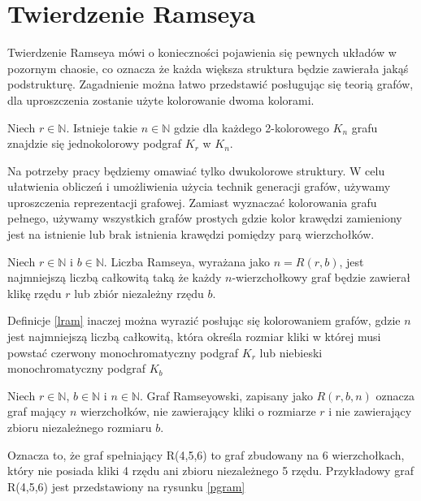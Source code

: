 \chapter{Twierdzenie Ramseya}
Twierdzenie Ramseya mówi o konieczności pojawienia się pewnych układów w pozornym chaosie\cite{dickson}, co oznacza że każda większa struktura będzie zawierała jakąś podstrukturę. Zagadnienie można łatwo przedstawić posługując się teorią grafów, dla uproszczenia zostanie użyte kolorowanie dwoma kolorami.

\begin{theorem}
Niech $r \in \mathbb{N}$. Istnieje takie $n \in \mathbb{N}$  gdzie dla każdego 2-kolorowego $\mathit{K}_{n}$ grafu znajdzie się jednokolorowy podgraf $\mathit{K}_{r}$ w $\mathit{K}_{n}$.  \cite{theory} 
\end{theorem}

Na potrzeby pracy będziemy omawiać tylko dwukolorowe struktury. W celu ułatwienia obliczeń i umożliwienia użycia technik generacji grafów, używamy uproszczenia reprezentacji grafowej. Zamiast wyznaczać kolorowania grafu pełnego, używamy wszystkich grafów prostych gdzie kolor krawędzi zamieniony jest na istnienie lub brak istnienia krawędzi pomiędzy parą wierzchołków.

\begin{definition}
Niech $r \in \mathbb{N}$ i $b \in \mathbb{N}$. Liczba Ramseya, wyrażana jako $n = R(r,b)$, jest najmniejszą liczbą całkowitą taką że każdy $n$-wierzchołkowy graf będzie zawierał klikę rzędu $r$ lub zbiór niezależny rzędu $b$.
  \cite{mainpaper} 
  \label{lram}
\end{definition}

Definicje \ref{lram} inaczej można wyrazić posłując się kolorowaniem grafów, gdzie $n$ jest najmniejszą liczbą całkowitą, która określa rozmiar kliki w której musi powstać czerwony monochromatyczny podgraf $\mathit{K}_{r}$ lub niebieski monochromatyczny podgraf $\mathit{K}_{b}$

\begin{definition}
Niech $r \in \mathbb{N}$, $b \in \mathbb{N}$ i $n \in \mathbb{N}$. Graf Ramseyowski, zapisany jako $R(r,b,n)$ oznacza graf mający $n$ wierzchołków, nie zawierający kliki o rozmiarze $r$ i nie zawierający zbioru niezależnego rozmiaru $b$.  \cite{mainpaper} 
\label{gram}
\end{definition}

Oznacza to, że graf spełniający R(4,5,6) to graf zbudowany na 6 wierzchołkach, który nie posiada kliki 4 rzędu ani zbioru niezależnego 5 rzędu. Przykładowy graf R(4,5,6) jest przedstawiony na rysunku \ref{pgram}

